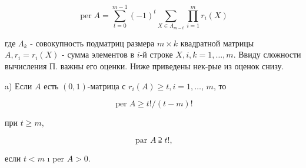 \documentclass[10pt]{article}
\begin{document}
\[
\operatorname{per} A=\sum_{t=0}^{m-1}(-1)^{t} \sum_{X \in \Lambda_{m-t}} \prod_{i=1}^{m} r_{i}(X)
\]

где $\Lambda_{k}$ - совокупность подматриц размера $m \times k$ квадратной матрицы $A, r_{i}=r_{i}(X)$ - сумма элементов в $i$-й строке $X, i, k=1, \ldots, m$. Ввиду сложности вычисления П. важны его оценки. Ниже приведены нек-рые из оценок снизу.

a) Если $A$ есть $(0,1)$-матрица с $r_{i}(A) \geqslant t, i=1, \ldots$, $m$, то

\[
\operatorname{per} A \geqslant t ! /(t-m) !
\]

при $t \geqslant m$,

\[
\text { par } A \supseteqq t !,
\]

если $t<m$ ı per $A>0$.
\end{document}
